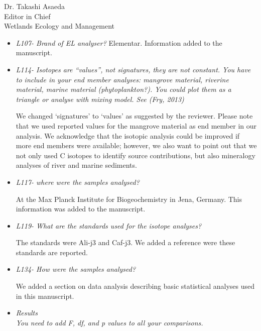 \documentclass[11pt]{bgcletter}
\begin{document}
\begin{letter}{Dr. Takashi Asaeda\\
 Editor in Chief \\ Wetlands Ecology and Management}
\begin{itemize}
\item {\it L107- Brand of EL analyser?}
{\color{blue} Elementar. Information added to the manuscript. }

\item {\it L114- Isotopes are ``values'', not signatures, they are not constant. You have to include in your end member analyses: mangrove material, riverine material, marine material (phytoplankton?). You could plot them as a triangle or analyse with mixing model. See (Fry, 2013)}

{\color{blue} We changed `signatures' to `values' as suggested by the reviewer. Please note that we used reported values for the mangrove material as end member in our analysis. We acknowledge that the isotopic analysis could be improved if more end members were available; however, we also want to point out that we not only used C isotopes to identify source contributions, but also mineralogy analyses of river and marine sediments.}


\item {\it L117- where were the samples analysed?}

{\color{blue}At the Max Planck Institute for Biogeochemistry in Jena, Germany. This information was added to the manuscript.}

\item {\it L119- What are the standards used for the isotope analyses? }

{\color{blue} The standards were Ali-j3 and Caf-j3. We added a reference were these standards are reported.}

\item {\it L134- How were the samples analysed? }

{\color{blue} We added a section on data analysis describing basic statistical analyses used in this manuscript.}

\item {\it Results \\
You need to add F, df, and p values to all your comparisons. }


\end{itemize}
\end{letter}
\end{document}
